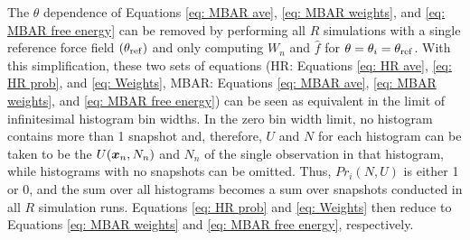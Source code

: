 \documentclass[journal=jced,manuscript=article]{achemso}
\newcommand{\bfv}[1]{{\mbox{\boldmath{$#1$}}}}
\newcommand{\x}{\bfv{x}}
\begin{document}
The $\theta$ dependence of Equations \ref{eq: MBAR ave}, \ref{eq: MBAR weights}, and \ref{eq: MBAR free energy} can be removed by performing all $R$ simulations with a single reference force field $(\theta_{\rm ref})$ and only computing $W_{n}$ and $\hat f$ for $\theta = \theta_i = \theta_{\rm ref}$. With this simplification, these two sets of equations (HR: Equations \ref{eq: HR ave}, \ref{eq: HR prob}, and \ref{eq: Weights}, MBAR: Equations \ref{eq: MBAR ave}, \ref{eq: MBAR weights}, and \ref{eq: MBAR free energy}) can be seen as equivalent in the limit of infinitesimal histogram bin widths. In the zero bin width limit, no histogram contains more than 1 snapshot and, therefore, $U$ and $N$ for each histogram can be taken to be the $U(\x_n,N_n)$ and $N_n$ of the single observation in that histogram, while histograms with no snapshots can be omitted. Thus, $Pr_i(N,U)$ is either 1 or 0, and the sum over all histograms becomes a sum over snapshots conducted in all $R$ simulation runs. Equations \ref{eq: HR prob} and \ref{eq: Weights} then reduce to Equations \ref{eq: MBAR weights} and \ref{eq: MBAR free energy}, respectively.

\end{document}
